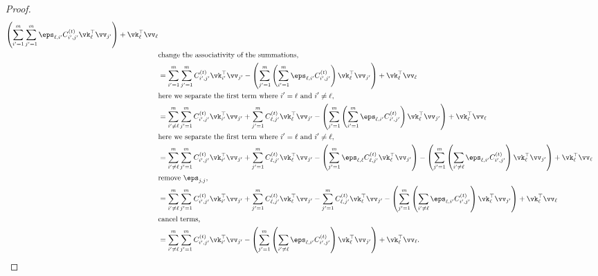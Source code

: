 \begin{proof}
\begin{align*}
    \left(\sum_{i'=1}^{\numPairs} \sum_{j'=1}^{\numPairs} \error{\ell}{i'} \errs{i'}{j'}{\timestep} \vk_{\ell}^{\top} \vv_{j'} \right) + \vk_{\ell}^{\top}\vv_{\ell} \\
     &\text{change the associativity of the summations,} \\
    &= \sum_{i'=1}^{\numPairs} \sum_{j'=1}^{\numPairs} \errs{i'}{j'}{\timestep} \vk_{i'}^{\top} \vv_{j'} -
    \left(\sum_{j'=1}^{\numPairs} \left(\sum_{i'=1}^{\numPairs} \error{\ell}{i'} \errs{i'}{j'}{\timestep}\right) \vk_{\ell}^{\top} \vv_{j'} \right) + \vk_{\ell}^{\top}\vv_{\ell} \\
    &\text{here we separate the first term where $i'=\ell$ and $i'\neq\ell$,}\\
    &= \sum_{i'\neq\ell}^{\numPairs} \sum_{j'=1}^{\numPairs} \errs{i'}{j'}{\timestep} \vk_{i'}^{\top} \vv_{j'} +  \sum_{j'=1}^{\numPairs} \errs{\ell}{j'}{\timestep} \vk_{\ell}^{\top} \vv_{j'} -
    \left(\sum_{j'=1}^{\numPairs} \left(\sum_{i'=1}^{\numPairs} \error{\ell}{i'} \errs{i'}{j'}{\timestep}\right) \vk_{\ell}^{\top} \vv_{j'} \right) + \vk_{\ell}^{\top}\vv_{\ell} \\
    &\text{here we separate the first term where $i'=\ell$ and $i'\neq\ell$,}\\
    &= \sum_{i'\neq\ell}^{\numPairs} \sum_{j'=1}^{\numPairs} \errs{i'}{j'}{\timestep} \vk_{i'}^{\top} \vv_{j'} +  \sum_{j'=1}^{\numPairs} \errs{\ell}{j'}{\timestep} \vk_{\ell}^{\top} \vv_{j'} -
    \left(\sum_{j'=1}^{\numPairs}  \error{\ell}{\ell} \errs{\ell}{j'}{\timestep}\vk_{\ell}^{\top} \vv_{j'} \right)-\left(\sum_{j'=1}^{\numPairs} \left(\sum_{i'\neq\ell} \error{\ell}{i'} \errs{i'}{j'}{\timestep}\right) \vk_{\ell}^{\top} \vv_{j'} \right) + \vk_{\ell}^{\top}\vv_{\ell} \\
    &\text{remove $\eps_{j,j}$,}\\
    &= \sum_{i'\neq\ell}^{\numPairs} \sum_{j'=1}^{\numPairs} \errs{i'}{j'}{\timestep} \vk_{i'}^{\top} \vv_{j'} +  \sum_{j'=1}^{\numPairs} \errs{\ell}{j'}{\timestep} \vk_{\ell}^{\top} \vv_{j'} -
    \sum_{j'=1}^{\numPairs} \errs{\ell}{j'}{\timestep}\vk_{\ell}^{\top} \vv_{j'} -\left(\sum_{j'=1}^{\numPairs} \left(\sum_{i'\neq\ell} \error{\ell}{i'} \errs{i'}{j'}{\timestep}\right) \vk_{\ell}^{\top} \vv_{j'} \right) + \vk_{\ell}^{\top}\vv_{\ell} \\
    &\text{cancel terms,}\\
    &= \sum_{i'\neq\ell}^{\numPairs} \sum_{j'=1}^{\numPairs} \errs{i'}{j'}{\timestep} \vk_{i'}^{\top} \vv_{j'} -\left(\sum_{j'=1}^{\numPairs} \left(\sum_{i'\neq\ell} \error{\ell}{i'} \errs{i'}{j'}{\timestep}\right) \vk_{\ell}^{\top} \vv_{j'} \right) + \vk_{\ell}^{\top}\vv_{\ell} .\\

\end{align*}
\end{proof}
